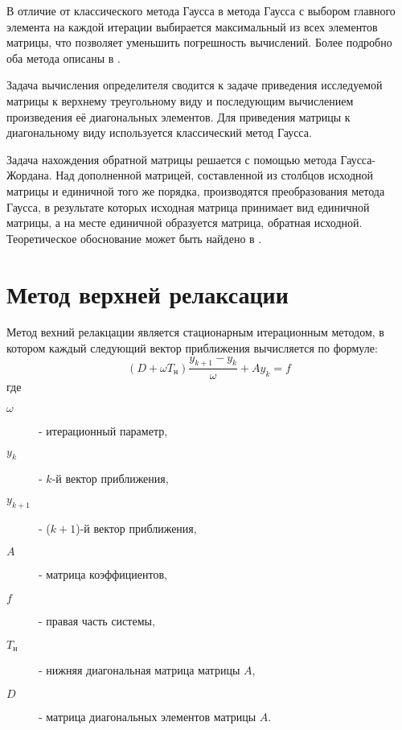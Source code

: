 \documentclass[12pt, a4paper]{report}
\begin{document}
\normalsize{В отличие от классического метода Гаусса в метода Гаусса с выбором главного элемента
            на каждой итерации выбирается максимальный из всех элементов матрицы, что позволяет
            уменьшить погрешность вычислений.
            Более подробно оба метода описаны в \cite{computational_science_gauss}.

\normalsize{Задача вычисления определителя сводится к задаче
            приведения исследуемой матрицы к верхнему треугольному виду
            и последующим вычислением произведения её диагональных элементов. 
            Для приведения матрицы к диагональному виду используется классический метод Гаусса.}

\normalsize{Задача нахождения обратной матрицы решается с помощью метода Гаусса-Жордана. 
            Над дополненной матрицей, составленной из столбцов исходной матрицы и единичной
            того же порядка, производятся преобразования метода Гаусса, в результате которых
            исходная матрица принимает вид единичной матрицы, а на месте единичной образуется
            матрица, обратная исходной. Теоретическое обоснование может быть найдено в \cite{algebra}}.

\section{Метод верхней релаксации}

\normalsize{Метод вехний релакцации является стационарным итерационным методом, 
            в котором каждый следующий вектор приближения вычисляется по формуле:
            \[ (D + \omega T_н) \frac{y_{k+1} - y_k}{\omega} + A y_k = f \]
            где 
            \begin{description}
                \item[$\omega$] - итерационный параметр, \\
                \item[$y_k$] - $k$-й вектор приближения, \\
                \item[$y_{k+1}$] - ($k+1$)-й вектор приближения, \\
                \item[$A$] - матрица коэффициентов, \\
                \item[$f$] - правая часть системы, \\
                \item[$T_н$] - нижняя диагональная матрица матрицы $A$, \\
                \item[$D$] - матрица диагональных элементов матрицы $A$. \\
            \end{description}}

}
\end{document}
